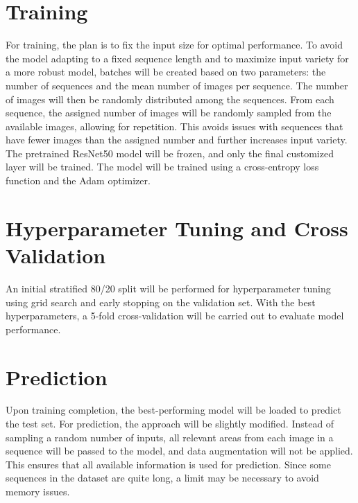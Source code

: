 \documentclass{article}
\begin{document}
\section*{Training} %

For training, the plan is to fix the input size for optimal performance. To avoid the model adapting to
a fixed sequence length and to maximize input variety for a more robust model, batches will be created based on two parameters:
the number of sequences and the mean number of images per sequence. The number of images will then be randomly
distributed among the sequences. From each sequence, the assigned number of images will be randomly sampled
from the available images, allowing for repetition. This avoids issues with sequences that have fewer images than the
assigned number and further increases input variety. The pretrained ResNet50 model will be frozen, and only
the final customized layer will be trained. The model will be trained using a cross-entropy loss function and the
Adam optimizer.

\section*{Hyperparameter Tuning and Cross Validation} %

An initial stratified 80/20 split will be performed for hyperparameter tuning using grid search and early stopping
on the validation set. With the best hyperparameters, a 5-fold cross-validation will be carried out to
evaluate model performance.

\section*{Prediction} %

Upon training completion, the best-performing model will be loaded to predict the test set.
For prediction, the approach will be slightly modified. Instead of sampling a random number of inputs, all relevant areas
from each image in a sequence will be passed to the model, and data augmentation will not be applied.
This ensures that all available information is used for prediction. Since some sequences in the dataset
are quite long, a limit may be necessary to avoid memory issues.



\printbibliography
\end{document}
